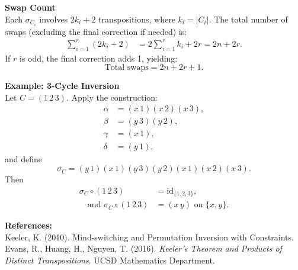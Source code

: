 \begin{technical}
\noindent\textbf{Swap Count}\\[0.5em]
Each \( \sigma_{C_i} \) involves \( 2k_i + 2 \) transpositions, where \( k_i = |C_i| \). The total number of swaps (excluding the final correction if needed) is:
\begin{align}
\sum_{i=1}^{r} (2k_i + 2) &= 2 \sum_{i=1}^{r} k_i + 2r = 2n + 2r.
\end{align}
If \( r \) is odd, the final correction adds 1, yielding:
\[
\text{Total swaps} = 2n + 2r + 1.
\]

\noindent\textbf{Example: 3-Cycle Inversion}\\[0.5em]
Let \( C = (1\,2\,3) \). Apply the construction:
\begin{align*}
\alpha &= (x\,1)(x\,2)(x\,3), \\
\beta  &= (y\,3)(y\,2), \\
\gamma &= (x\,1), \\
\delta &= (y\,1),
\end{align*}
and define
\[
\sigma_C = (y\,1)(x\,1)(y\,3)(y\,2)(x\,1)(x\,2)(x\,3).
\]
Then
\begin{align}
\sigma_C \circ (1\,2\,3) &= \text{id}_{\{1,2,3\}}, \\\quad \text{and } \sigma_C \circ (1\,2\,3) &= (x\, y) \text{ on } \{x, y\}.
\end{align}

\vspace{0.5em}
\noindent\textbf{References:}\\
Keeler, K. (2010). Mind-switching and Permutation Inversion with Constraints.\\
Evans, R., Huang, H., Nguyen, T. (2016). \textit{Keeler’s Theorem and Products of Distinct Transpositions}. UCSD Mathematics Department.
\end{technical}
